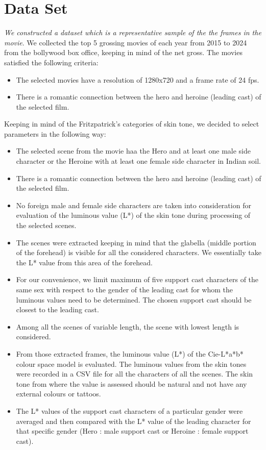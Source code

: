 \section{Data Set}
\label{sec:dataset}

\textit{We constructed a dataset which is a representative sample of the the frames in the movie}. We collected the top 5 grossing movies of each year from 2015 to 2024 from the bollywood box office, keeping in mind of the net gross. The movies satisfied the following criteria:

\begin{itemize}
    \item The selected movies have a resolution of 1280x720 and a frame rate of 24 fps.
    \item There is a romantic connection between the hero and heroine (leading cast) of the
    selected film.
\end{itemize}

Keeping in mind of the Fritzpatrick's categories of skin tone, we decided to select parameters in the following way:
\begin{itemize}
    \item The selected scene from the movie haa the Hero and at least one male side character or the Heroine with at least one female side character in Indian soil.
    \item There is a romantic connection between the hero and heroine (leading cast) of the
    selected film.
    \item No foreign male and female side characters are taken into consideration for evaluation of the
    luminous value (L*) of the skin tone during processing of the selected scenes.
    \item The scenes were extracted keeping in mind that the glabella (middle portion of the forehead) is visible for all the considered characters. We essentially take the L* value from this area of the forehead.
    \item For our convenience, we limit maximum of five support cast characters of the same sex with respect to the gender of the leading cast for whom the luminous values need to be determined. The chosen support cast should be closest to the leading cast.
    \item Among all the scenes of variable length, the scene with lowest length is considered. 
    \item From those extracted frames, the luminous value (L*) of the Cie-L*a*b* colour space model is evaluated. The luminous values from the skin tones were recorded in a CSV file for all the characters of all the scenes. The skin tone from where the value is assessed should be natural and not have any external colours or tattoos.
    \item The L* values of the support cast characters of a particular gender were averaged and then compared with the L* value of the leading character for that specific gender (Hero : male support cast or Heroine : female support cast).
\end{itemize}

